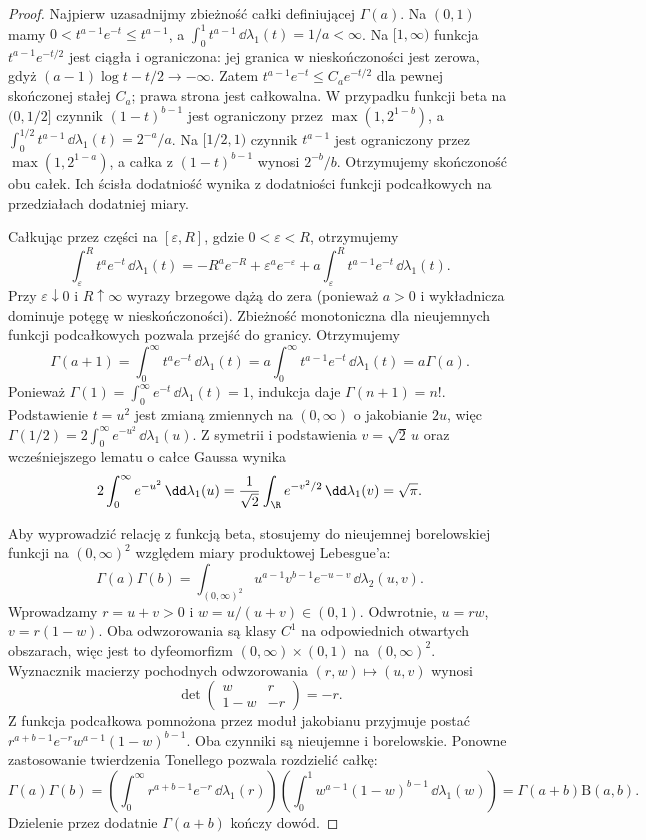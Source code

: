 \begin{proof}
Najpierw uzasadnijmy zbieżność całki definiującej
$\Gamma(a)$. Na $(0,1)$ mamy $0<t^{a-1}e^{-t}\leq t^{a-1}$,
a $\int_0^1t^{a-1}\,\dd\lambda_1(t)=1/a<\infty$.
Na $[1,\infty)$ funkcja $t^{a-1}e^{-t/2}$ jest
ciągła i ograniczona: jej granica w nieskończoności
jest zerowa, gdyż $(a-1)\log t-t/2\to-\infty$.
Zatem $t^{a-1}e^{-t}\leq C_a e^{-t/2}$ dla pewnej
skończonej stałej $C_a$; prawa strona jest całkowalna.
W przypadku funkcji beta na $(0,1/2]$ czynnik
$(1-t)^{b-1}$ jest ograniczony przez $\max(1,2^{1-b})$,
a $\int_0^{1/2}t^{a-1}\,\dd\lambda_1(t)=2^{-a}/a$.
Na $[1/2,1)$ czynnik $t^{a-1}$ jest ograniczony przez
$\max(1,2^{1-a})$, a całka z $(1-t)^{b-1}$
wynosi $2^{-b}/b$. Otrzymujemy skończoność obu całek.
Ich ścisła dodatniość wynika z dodatniości funkcji
podcałkowych na przedziałach dodatniej miary.

Całkując przez części na $[\varepsilon,R]$,
gdzie $0<\varepsilon<R$, otrzymujemy
\[
\int_\varepsilon^R t^ae^{-t}\,\dd\lambda_1(t)
=-R^ae^{-R}+\varepsilon^ae^{-\varepsilon}
+a\int_\varepsilon^R t^{a-1}e^{-t}\,\dd\lambda_1(t).
\]
Przy $\varepsilon\downarrow0$ i $R\uparrow\infty$
wyrazy brzegowe dążą do zera (ponieważ $a>0$
i wykładnicza dominuje potęgę w nieskończoności).
Zbieżność monotoniczna dla nieujemnych funkcji
podcałkowych pozwala przejść do granicy. Otrzymujemy
\[
\Gamma(a+1)=\int_0^\infty t^ae^{-t}\,\dd\lambda_1(t)
=a\int_0^\infty t^{a-1}e^{-t}\,\dd\lambda_1(t)
=a\Gamma(a).
\]
Ponieważ $\Gamma(1)=\int_0^\infty e^{-t}\,\dd\lambda_1(t)=1$,
indukcja daje $\Gamma(n+1)=n!$.
Podstawienie $t=u^2$ jest zmianą zmiennych na
$(0,\infty)$ o jakobianie $2u$, więc
$\Gamma(1/2)=2\int_0^\infty e^{-u^2}\,\dd\lambda_1(u)$.
Z symetrii i podstawienia $v=\sqrt2\,u$ oraz
wcześniejszego lematu o całce Gaussa wynika
\[
2\int_0^\infty e^{-u^2}\,\dd\lambda_1(u)
=\frac1{\sqrt2}\int_\R e^{-v^2/2}\,\dd\lambda_1(v)=\sqrt\pi.
\]

Aby wyprowadzić relację z funkcją beta, stosujemy
do nieujemnej borelowskiej funkcji na $(0,\infty)^2$
względem miary produktowej Lebesgue'a:
\[
\Gamma(a)\Gamma(b)
=\int_{(0,\infty)^2}u^{a-1}v^{b-1}e^{-u-v}
\,\dd\lambda_2(u,v).
\]
Wprowadzamy $r=u+v>0$ i $w=u/(u+v)\in(0,1)$.
Odwrotnie, $u=rw$, $v=r(1-w)$.
Oba odwzorowania są klasy $C^1$ na odpowiednich
otwartych obszarach, więc jest to dyfeomorfizm
$(0,\infty)\times(0,1)$ na $(0,\infty)^2$.
Wyznacznik macierzy pochodnych odwzorowania
$(r,w)\mapsto(u,v)$ wynosi
\[
\det\begin{pmatrix}w&r\\1-w&-r\end{pmatrix}=-r.
\]
Z 
funkcja podcałkowa pomnożona przez moduł jakobianu
przyjmuje postać
$r^{a+b-1}e^{-r}w^{a-1}(1-w)^{b-1}$.
Oba czynniki są nieujemne i borelowskie.
Ponowne zastosowanie twierdzenia Tonellego pozwala
rozdzielić całkę:
\[
\Gamma(a)\Gamma(b)
=\left(\int_0^\infty r^{a+b-1}e^{-r}\,\dd\lambda_1(r)\right)
\left(\int_0^1w^{a-1}(1-w)^{b-1}\,\dd\lambda_1(w)\right)
=\Gamma(a+b)\mathrm B(a,b).
\]
Dzielenie przez dodatnie $\Gamma(a+b)$ kończy dowód.
\end{proof}


